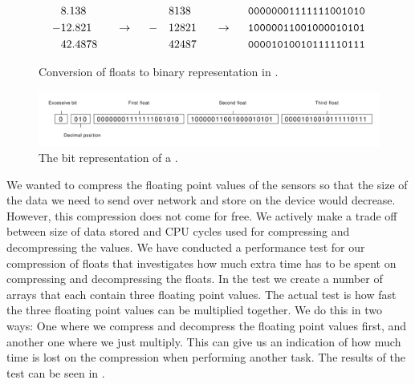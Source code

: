 \begin{figure}[!htbp]
    \begin{alignat*}{6}
       &8.138   &&                   &&   && 8138  &&                   && \text{\texttt{00000001111111001010}} \\
      -&12.821  && ~~ \rightarrow ~~ && - && 12821 && ~~ \rightarrow ~~ && \text{\texttt{10000011001000010101}} \\
       &42.4878 &&                   &&   && 42487 &&                   && \text{\texttt{00001010010111110111}} 
    \end{alignat*}
    \caption{Conversion of floats to binary representation in .}
    \label{fig:float_triple_convert}
\end{figure}
\FloatBarrier

\begin{figure}[!htbp]
    \centering
    \includegraphics[width=\textwidth]{graphic/gathering_sensor_data/float_triple_bit}
    \caption{The bit representation of a .}
    \label{fig:float_triple_bit}
\end{figure}
\FloatBarrier

We wanted to compress the floating point values of the sensors so that the size of the data we need to send over network and store on the device would decrease. However, this compression does not come for free. We actively make a trade off between size of data stored and CPU cycles used for compressing and decompressing the values. We have conducted a performance test for our compression of floats that investigates how much extra time has to be spent on compressing and decompressing the floats. In the test we create a number of arrays that each contain three floating point values. The actual test is how fast the three floating point values can be multiplied together. We do this in two ways: One where we compress and decompress the floating point values first, and another one where we just multiply. This can give us an indication of how much time is lost on the compression when performing another task. The results of the test can be seen in .

